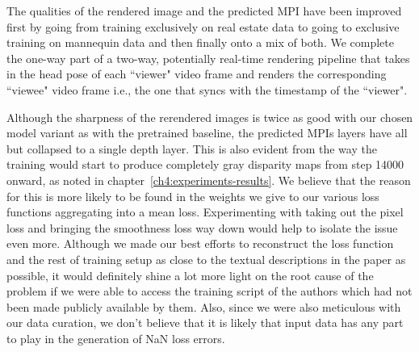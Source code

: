 The qualities of the rendered image and the predicted MPI have been improved first by going from training exclusively on real estate data to going to exclusive training on mannequin data and then finally onto a mix of both. We complete the one-way part of a two-way, potentially real-time rendering pipeline that takes in the head pose of each ``viewer" video frame and renders the corresponding ``viewee" video frame i.e., the one that syncs with the timestamp of the ``viewer".

Although the sharpness of the rerendered images is twice as good with our chosen model variant as with the pretrained baseline, the predicted MPIs layers have all but collapsed to a single depth layer. This is also evident from the way the training would start to produce completely gray disparity maps from step 14000 onward, as noted in chapter~\ref{ch4:experiments-results}. We believe that the reason for this is more likely to be found in the weights we give to our various loss functions aggregating into a mean loss. Experimenting with taking out the pixel loss and bringing the smoothness loss way down would help to isolate the issue even more. Although we made our best efforts to reconstruct the loss function and the rest of training setup as close to the textual descriptions in the paper as possible, it would definitely shine a lot more light on the root cause of the problem if we were able to access the training script of the authors which had not been made publicly available by them. Also, since we were also meticulous with our data curation, we don't believe that it is likely that input data has any part to play in the generation of NaN loss errors.  


